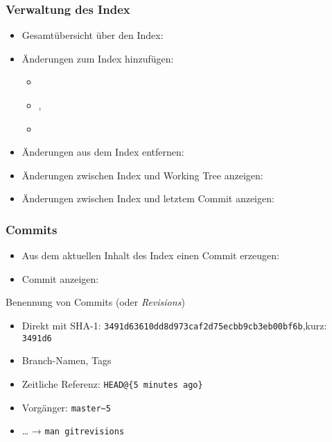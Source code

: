 \documentclass{cms-kurs}
\begin{document}
\begin{frame}
  \frametitle{Verwaltung des Index}

  \onslide<+->

  \begin{itemize}
  \item Gesamtübersicht über den Index: 
  \item Änderungen zum Index hinzufügen:
    \begin{itemize}
    \item {}
    \item {}, 
    \item {}
    \end{itemize}
  \item Änderungen aus dem Index entfernen: 
  \item Änderungen zwischen Index und Working Tree anzeigen: 
  \item Änderungen zwischen Index und letztem Commit anzeigen: 
  \end{itemize}

\end{frame}

\begin{frame}[fragile]
  \frametitle{Commits}

  \onslide<+->

  \begin{itemize}
  \item Aus dem aktuellen Inhalt des Index einen Commit erzeugen:
  \item Commit anzeigen: 
  \end{itemize}

  \onslide<+->

  \begin{block}{Benennung von Commits (oder \emph{Revisions})}
    \begin{itemize}
    \item Direkt mit SHA-1:
      \texttt{3491d63610dd8d973caf2d75ecbb9cb3eb00bf6b},\newline kurz:
      \texttt{3491d6}
    \item Branch-Namen, Tags
    \item Zeitliche Referenz: \verb=HEAD@{5 minutes ago}=
    \item Vorgänger: \verb=master~5=
    \item … → \verb=man gitrevisions=
    \end{itemize}
  \end{block}

\end{frame}
\end{document}
